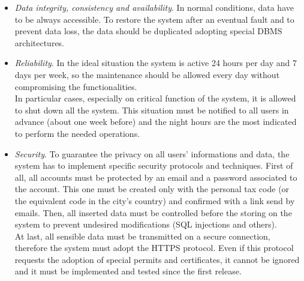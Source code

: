 \begin{itemize}
	\item \textit{Data integrity, consistency and availability}. In normal conditions, data have to be always accessible. To restore the system after an eventual fault and to prevent data loss, the data should be duplicated adopting special DBMS architectures.

	\item \textit{Reliability}. In the ideal situation the system is active 24 hours per day and 7 days per week, so the maintenance should be allowed every day without compromising the functionalities.\\
In particular cases, especially on critical function of the system, it is allowed to shut down all the system. This situation must be notified to all users in advance (about one week before) and the night hours are the most indicated to perform the needed operations.

	\item \textit{Security}. To guarantee the privacy on all users' informations and data, the system has to implement specific security protocols and techniques.
First of all, all accounts must be protected by an email and a password associated to the account. This one must be created only with the personal tax code (or the equivalent code in the city's country) and confirmed with a link send by emails. Then, all inserted data must be controlled before the storing on the system to prevent undesired modifications (SQL injections and others).\\
At last, all sensible data must be transmitted on a secure connection, therefore the system must adopt the HTTPS protocol. Even if this protocol requests the adoption of special permits and certificates, it cannot be ignored and it must be implemented and tested since the first release.


\end{itemize}

\acresetall